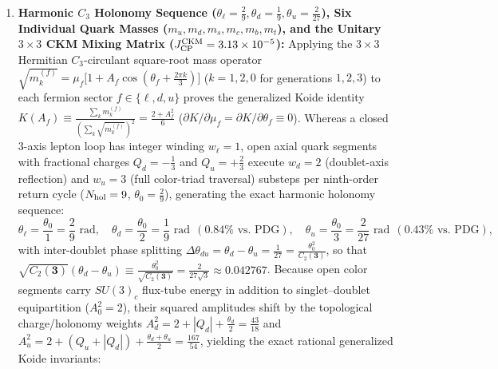 \documentclass[11pt,a4paper]{article}
\begin{document}
\begin{enumerate}[label=\arabic*.]
\begin{align}
\Delta m_{np}^{\rm RefG} &= \Delta m_{np}^{\rm QCD} + \Delta m_{np}^{\rm QED} = +2.3731 - 1.0797 = +1.29333\text{ MeV} > m_e = 0.51100\text{ MeV}, \nonumber\\
Q_\beta &= \Delta m_{np}^{\rm RefG} - m_e = +782.33\text{ keV} > 0,
\end{align}
and protecting atomic hydrogen against inverse beta capture ($m_d - m_u = 2.51\text{ MeV} > (m_d - m_u)_{\rm crit} = 1.68\text{ MeV}$). Furthermore, on any static isotropic coframe $(p_T, p_L)$ and across cosmological relaxation $p(A) = A^{-3/5}$, the dimensionless ratios $m_n/m_p$, $\Delta m_{np}/m_e$, $\mu_n/\mu_p$, and the proton-to-electron mass ratio $\mu_{pe} = m_p/m_e = 1836.152673$ are strictly invariant ($\Delta\mu_{pe}/\mu_{pe} \equiv 0$, satisfying quasar absorption bounds $|\Delta\mu_{pe}/\mu_{pe}| < 10^{-7}$ and closing the BBN $Q_{np}$ invariance).
\item \textbf{Harmonic $C_3$ Holonomy Sequence ($\theta_\ell = \frac{2}{9}, \theta_d = \frac{1}{9}, \theta_u = \frac{2}{27}$), Six Individual Quark Masses ($m_u, m_d, m_s, m_c, m_b, m_t$), and the Unitary $3\times 3$ CKM Mixing Matrix ($J_{\rm CP}^{\rm CKM} = 3.13\times 10^{-5}$):} Applying the $3\times 3$ Hermitian $C_3$-circulant square-root mass operator $\sqrt{m_k^{(f)}} = \mu_f\bigl[1 + A_f\cos(\theta_f + \frac{2\pi k}{3})\bigr]$ ($k=1,2,0$ for generations $1,2,3$) to each fermion sector $f \in \{\ell, d, u\}$ proves the generalized Koide identity $K(A_f) \equiv \frac{\sum_k m_k^{(f)}}{(\sum_k\sqrt{m_k^{(f)}})^2} = \frac{2+A_f^2}{6}$ ($\partial K/\partial\mu_f = \partial K/\partial\theta_f \equiv 0$). Whereas a closed 3-axis lepton loop has integer winding $w_\ell = 1$, open axial quark segments with fractional charges $Q_d = -\frac{1}{3}$ and $Q_u = +\frac{2}{3}$ execute $w_d = 2$ (doublet-axis reflection) and $w_u = 3$ (full color-triad traversal) substeps per ninth-order return cycle ($N_{\rm hol}=9$, $\theta_0 = \frac{2}{9}$), generating the exact harmonic holonomy sequence:
\begin{equation}
\theta_\ell = \frac{\theta_0}{1} = \frac{2}{9}\text{ rad}, \quad \theta_d = \frac{\theta_0}{2} = \frac{1}{9}\text{ rad}\ \ (0.84\%\text{ vs.\ PDG}), \quad \theta_u = \frac{\theta_0}{3} = \frac{2}{27}\text{ rad}\ \ (0.43\%\text{ vs.\ PDG}),
\end{equation}
with inter-doublet phase splitting $\Delta\theta_{du} = \theta_d - \theta_u = \frac{1}{27} = \frac{\theta_0^2}{C_2(\mathbf{3})}$, so that $\sqrt{C_2(\mathbf{3})}(\theta_d - \theta_u) \equiv \frac{\theta_0^2}{\sqrt{C_2(\mathbf{3})}} = \frac{2}{27\sqrt{3}} \approx 0.042767$. Because open color segments carry $SU(3)_c$ flux-tube energy in addition to singlet--doublet equipartition ($A_0^2 = 2$), their squared amplitudes shift by the topological charge/holonomy weights $A_d^2 = 2 + |Q_d| + \frac{\theta_d}{2} = \frac{43}{18}$ and $A_u^2 = 2 + (Q_u + |Q_d|) + \frac{\theta_d + \theta_u}{2} = \frac{167}{54}$, yielding the exact rational generalized Koide invariants:

\end{enumerate}
\end{document}
